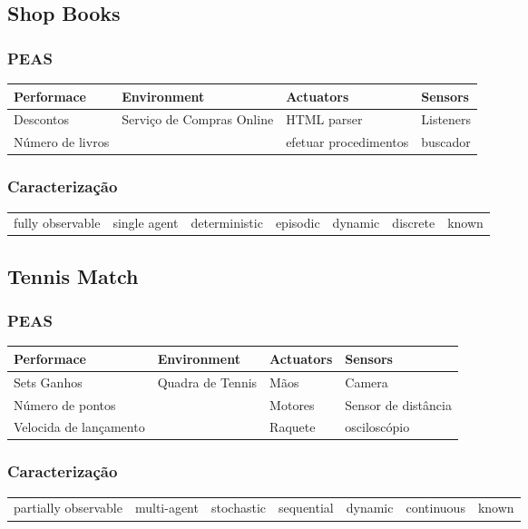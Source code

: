 \documentclass[a4paper,12pt]{article}
\begin{document}
\subsection{Shop Books}
\subsubsection{PEAS}
\begin{table}[h!]
\begin{tabular}{l|l|l|l}
\hline
Performace & Environment & Actuators & Sensors \\
\hline
Descontos & Serviço de Compras Online & HTML parser & Listeners \\
Número de livros & & efetuar procedimentos & buscador\\
\end{tabular}
\end{table}
\subsubsection{Caracterização}
\begin{table}[h!]
\begin{tabular}{|c|c|c|c|c|c|c|}
\hline
fully observable & single agent & deterministic & episodic & dynamic & discrete & known
\end{tabular}
\end{table}

\subsection{Tennis Match}
\subsubsection{PEAS}
\begin{table}[h!]
\begin{tabular}{l|l|l|l}
\hline
Performace & Environment & Actuators & Sensors \\
\hline
Sets Ganhos & Quadra de Tennis & Mãos & Camera \\
Número de pontos & & Motores & Sensor de distância\\
Velocida de lançamento & & Raquete & osciloscópio\\
\end{tabular}
\end{table}
\subsubsection{Caracterização}
\begin{table}[h!]
\begin{tabular}{|c|c|c|c|c|c|c|}
\hline
partially observable & multi-agent & stochastic & sequential & dynamic & continuous & known
\end{tabular}
\end{table}
\end{document}
